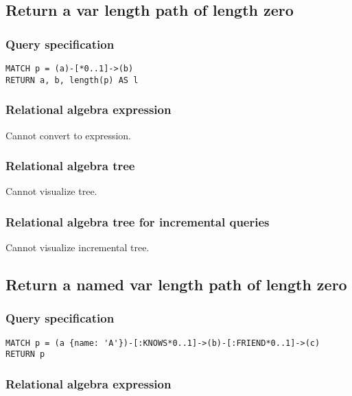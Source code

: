 \subsection{Return a var length path of length zero}

\subsubsection*{Query specification}

\begin{lstlisting}
MATCH p = (a)-[*0..1]->(b)
RETURN a, b, length(p) AS l
\end{lstlisting}

\subsubsection*{Relational algebra expression}

Cannot convert to expression.

\subsubsection*{Relational algebra tree}

Cannot visualize tree.

\subsubsection*{Relational algebra tree for incremental queries}

Cannot visualize incremental tree.

\subsection{Return a named var length path of length zero}

\subsubsection*{Query specification}

\begin{lstlisting}
MATCH p = (a {name: 'A'})-[:KNOWS*0..1]->(b)-[:FRIEND*0..1]->(c)
RETURN p
\end{lstlisting}

\subsubsection*{Relational algebra expression}

